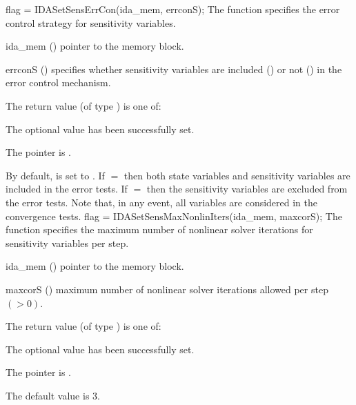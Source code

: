 {
  flag = IDASetSensErrCon(ida\_mem, errconS);
}
{
  The function  specifies the error control
  strategy for sensitivity variables.
}
{
  \begin{args}
  \item[ida\_mem] ()
    pointer to the {\idas} memory block.
  \item[errconS] ()
    specifies whether sensitivity variables are included () or not
    () in the error control mechanism.
  \end{args}
}
{
  The return value  (of type ) is one of:
  \begin{args}
  \item[\Id{IDA\_SUCCESS}] 
    The optional value has been successfully set.
  \item[\Id{IDA\_MEM\_NULL}]
    The  pointer is .
  \end{args}
}
{
  By default,  is set to . 
  If $=$ then both state variables and
  sensitivity variables are included in the error tests. 
  If $=$ then the sensitivity variables are excluded from the 
  error tests. Note that, in any event, all variables are considered in the convergence 
  tests.
}
{
  flag = IDASetSensMaxNonlinIters(ida\_mem, maxcorS);
}
{
  The function  specifies the maximum
  number of nonlinear solver iterations for sensitivity variables per step.
}
{
  \begin{args}
  \item[ida\_mem] ()
    pointer to the {\idas} memory block.
  \item[maxcorS] ()
    maximum number of nonlinear solver iterations allowed per step $( > 0)$.
  \end{args}
}
{
  The return value  (of type ) is one of:
  \begin{args}
  \item[\Id{IDA\_SUCCESS}] 
    The optional value has been successfully set.
  \item[\Id{IDA\_MEM\_NULL}]
    The  pointer is .
  \end{args}
}
{
  The default value is $3$.
}

